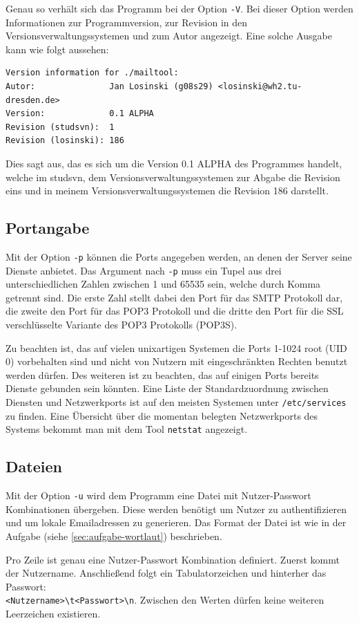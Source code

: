 \documentclass[final,a4paper,11pt,notitlepage,halfparskip]{scrreprt}
\begin{document}
Genau so verhält sich das Programm bei der Option \texttt{-V}. Bei dieser Option
werden Informationen zur Programmversion, zur Revision in den
Versionsverwaltungssystemen und zum Autor angezeigt. Eine solche Ausgabe kann
wie folgt aussehen:
\begin{verbatim}
Version information for ./mailtool:
Autor:               Jan Losinski (g08s29) <losinski@wh2.tu-dresden.de>
Version:             0.1 ALPHA
Revision (studsvn):  1
Revision (losinski): 186
\end{verbatim}
Dies sagt aus, das es sich um die Version 0.1 ALPHA des Programmes handelt,
welche im studsvn, dem Versionsverwaltungssystemen zur Abgabe die Revision eins 
und in meinem Versionsverwaltungssystemen die Revision 186 darstellt.

\subsection{Portangabe}
Mit der Option \texttt{-p} können die Ports angegeben werden, an denen der
Server seine Dienste anbietet. Das Argument nach \texttt{-p} muss ein Tupel aus
drei unterschiedlichen Zahlen zwischen 1 und 65535 sein, welche durch Komma
getrennt sind. Die erste Zahl stellt dabei den Port für das SMTP Protokoll dar,
die zweite den Port für das POP3 Protokoll und die dritte den Port für die SSL
verschlüsselte Variante des POP3 Protokolls (POP3S). 

Zu beachten ist, das auf vielen unixartigen Systemen die Ports 1-1024 root (UID 
0) vorbehalten sind und nicht von Nutzern mit eingeschränkten Rechten benutzt 
werden dürfen. Des weiteren ist zu beachten, das auf einigen Ports bereits 
Dienste gebunden sein könnten. Eine Liste der Standardzuordnung zwischen 
Diensten und Netzwerkports ist auf den meisten Systemen unter
\texttt{/etc/services} zu finden. Eine Übersicht über die momentan belegten
Netzwerkports des Systems bekommt man mit dem Tool \texttt{netstat} angezeigt.

\subsection{Dateien}
Mit der Option \texttt{-u} wird dem Programm eine Datei mit Nutzer-Passwort
Kombinationen übergeben. Diese werden benötigt um Nutzer zu authentifizieren und
um lokale Emailadressen zu generieren. Das Format der Datei ist wie in der
Aufgabe (siehe \ref{sec:aufgabe-wortlaut}) beschrieben. 

Pro Zeile ist genau eine Nutzer-Passwort Kombination definiert. Zuerst kommt der
Nutzername. Anschließend folgt ein Tabulatorzeichen und hinterher das
Passwort:\\
\texttt{<Nutzername>\textbackslash t<Passwort>\textbackslash n}. Zwischen den
Werten dürfen keine weiteren Leerzeichen existieren.
\end{document}
